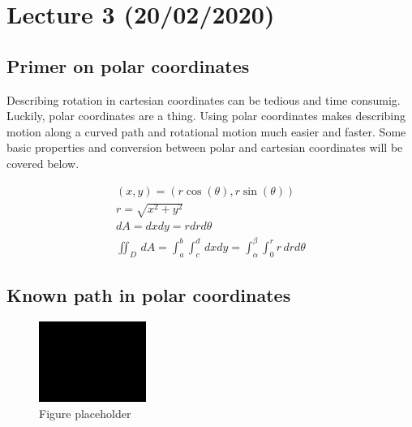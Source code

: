 \documentclass[11pt, a4paper]{article}
\begin{document}
\setcounter{section}{3}
\section{Lecture 3 (20/02/2020)}
\subsection{Primer on polar coordinates}
Describing rotation in cartesian coordinates can be tedious and time consumig. Luckily, polar
coordinates are a thing. Using polar coordinates makes describing motion along a curved path and
rotational motion much easier and faster. Some basic properties and conversion between polar and cartesian
coordinates will be covered below.

\begin{gather}
    (x , y) = (r\cos(\theta), r\sin(\theta))\\
    r = \sqrt{x^2 + y^2}\\
    dA = dxdy = rdrd\theta\\
    \iint_{D}\,dA = \int_{a}^{b} \int_{c}^{d}\,dxdy = \int_{\alpha}^{\beta} \int_{0}^{r} r\,drd\theta
\end{gather}

\subsection{Known path in polar coordinates}
\begin{figure}[h]
    \centerline{\includegraphics[width=3.5cm]{images/placeholder.png}}
    \caption{Figure placeholder}
\end{figure}
\end{document}
